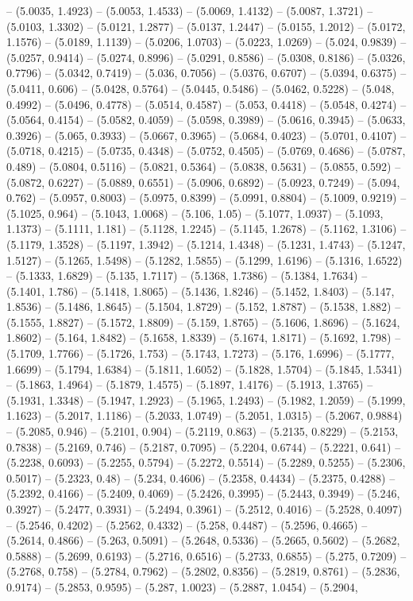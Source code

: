 -- (5.0035, 1.4923) -- (5.0053, 1.4533) -- (5.0069, 1.4132) -- (5.0087, 1.3721) -- (5.0103, 1.3302) -- (5.0121, 1.2877) -- (5.0137, 1.2447) -- (5.0155, 1.2012) -- (5.0172, 1.1576) -- (5.0189, 1.1139) -- (5.0206, 1.0703) -- (5.0223, 1.0269) -- (5.024, 0.9839) -- (5.0257, 0.9414) -- (5.0274, 0.8996) -- (5.0291, 0.8586) -- (5.0308, 0.8186) -- (5.0326, 0.7796) -- (5.0342, 0.7419) -- (5.036, 0.7056) -- (5.0376, 0.6707) -- (5.0394, 0.6375) -- (5.0411, 0.606) -- (5.0428, 0.5764) -- (5.0445, 0.5486) -- (5.0462, 0.5228) -- (5.048, 0.4992) -- (5.0496, 0.4778) -- (5.0514, 0.4587) -- (5.053, 0.4418) -- (5.0548, 0.4274) -- (5.0564, 0.4154) -- (5.0582, 0.4059) -- (5.0598, 0.3989) -- (5.0616, 0.3945) -- (5.0633, 0.3926) -- (5.065, 0.3933) -- (5.0667, 0.3965) -- (5.0684, 0.4023) -- (5.0701, 0.4107) -- (5.0718, 0.4215) -- (5.0735, 0.4348) -- (5.0752, 0.4505) -- (5.0769, 0.4686) -- (5.0787, 0.489) -- (5.0804, 0.5116) -- (5.0821, 0.5364) -- (5.0838, 0.5631) -- (5.0855, 0.592) -- (5.0872, 0.6227) -- (5.0889, 0.6551) -- (5.0906, 0.6892) -- (5.0923, 0.7249) -- (5.094, 0.762) -- (5.0957, 0.8003) -- (5.0975, 0.8399) -- (5.0991, 0.8804) -- (5.1009, 0.9219) -- (5.1025, 0.964) -- (5.1043, 1.0068) -- (5.106, 1.05) -- (5.1077, 1.0937) -- (5.1093, 1.1373) -- (5.1111, 1.181) -- (5.1128, 1.2245) -- (5.1145, 1.2678) -- (5.1162, 1.3106) -- (5.1179, 1.3528) -- (5.1197, 1.3942) -- (5.1214, 1.4348) -- (5.1231, 1.4743) -- (5.1247, 1.5127) -- (5.1265, 1.5498) -- (5.1282, 1.5855) -- (5.1299, 1.6196) -- (5.1316, 1.6522) -- (5.1333, 1.6829) -- (5.135, 1.7117) -- (5.1368, 1.7386) -- (5.1384, 1.7634) -- (5.1401, 1.786) -- (5.1418, 1.8065) -- (5.1436, 1.8246) -- (5.1452, 1.8403) -- (5.147, 1.8536) -- (5.1486, 1.8645) -- (5.1504, 1.8729) -- (5.152, 1.8787) -- (5.1538, 1.882) -- (5.1555, 1.8827) -- (5.1572, 1.8809) -- (5.159, 1.8765) -- (5.1606, 1.8696) -- (5.1624, 1.8602) -- (5.164, 1.8482) -- (5.1658, 1.8339) -- (5.1674, 1.8171) -- (5.1692, 1.798) -- (5.1709, 1.7766) -- (5.1726, 1.753) -- (5.1743, 1.7273) -- (5.176, 1.6996) -- (5.1777, 1.6699) -- (5.1794, 1.6384) -- (5.1811, 1.6052) -- (5.1828, 1.5704) -- (5.1845, 1.5341) -- (5.1863, 1.4964) -- (5.1879, 1.4575) -- (5.1897, 1.4176) -- (5.1913, 1.3765) -- (5.1931, 1.3348) -- (5.1947, 1.2923) -- (5.1965, 1.2493) -- (5.1982, 1.2059) -- (5.1999, 1.1623) -- (5.2017, 1.1186) -- (5.2033, 1.0749) -- (5.2051, 1.0315) -- (5.2067, 0.9884) -- (5.2085, 0.946) -- (5.2101, 0.904) -- (5.2119, 0.863) -- (5.2135, 0.8229) -- (5.2153, 0.7838) -- (5.2169, 0.746) -- (5.2187, 0.7095) -- (5.2204, 0.6744) -- (5.2221, 0.641) -- (5.2238, 0.6093) -- (5.2255, 0.5794) -- (5.2272, 0.5514) -- (5.2289, 0.5255) -- (5.2306, 0.5017) -- (5.2323, 0.48) -- (5.234, 0.4606) -- (5.2358, 0.4434) -- (5.2375, 0.4288) -- (5.2392, 0.4166) -- (5.2409, 0.4069) -- (5.2426, 0.3995) -- (5.2443, 0.3949) -- (5.246, 0.3927) -- (5.2477, 0.3931) -- (5.2494, 0.3961) -- (5.2512, 0.4016) -- (5.2528, 0.4097) -- (5.2546, 0.4202) -- (5.2562, 0.4332) -- (5.258, 0.4487) -- (5.2596, 0.4665) -- (5.2614, 0.4866) -- (5.263, 0.5091) -- (5.2648, 0.5336) -- (5.2665, 0.5602) -- (5.2682, 0.5888) -- (5.2699, 0.6193) -- (5.2716, 0.6516) -- (5.2733, 0.6855) -- (5.275, 0.7209) -- (5.2768, 0.758) -- (5.2784, 0.7962) -- (5.2802, 0.8356) -- (5.2819, 0.8761) -- (5.2836, 0.9174) -- (5.2853, 0.9595) -- (5.287, 1.0023) -- (5.2887, 1.0454) -- (5.2904, 